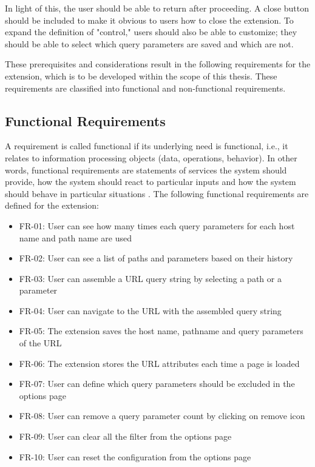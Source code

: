 In light of this, the user should be able to return after proceeding. A close button should be included to make it obvious to users how to close the extension. To expand the definition of "control," users should also be able to customize; they should be able to select which query parameters are saved and which are not.

These prerequisites and considerations result in the following requirements for the extension, which is to be developed within the scope of this thesis. These requirements are classified into functional and non-functional requirements.

\subsection{Functional Requirements}
\label{functional_requirements}
A requirement is called functional if its underlying need is functional, i.e., it relates to information processing objects (data, operations, behavior). In other words, functional requirements are statements of services the system should provide, how the system should react to particular inputs and how the system should behave in particular situations \autocite{sommerville2011software}. The following functional requirements are defined for the extension:

\begin{itemize}
  \item FR-01: User can see how many times each query parameters for each host name and path name are used
  \item FR-02: User can see a list of paths and parameters based on their history
  \item FR-03: User can assemble a URL query string by selecting a path or a parameter
  \item FR-04: User can navigate to the URL with the assembled query string
  \item FR-05: The extension saves the host name, pathname and query parameters of the URL
  \item FR-06: The extension stores the URL attributes each time a page is loaded
  \item FR-07: User can define which query parameters should be excluded in the options page
  \item FR-08: User can remove a query parameter count by clicking on remove icon
  \item FR-09: User can clear all the filter from the options page
  \item FR-10: User can reset the configuration from the options page
\end{itemize}

